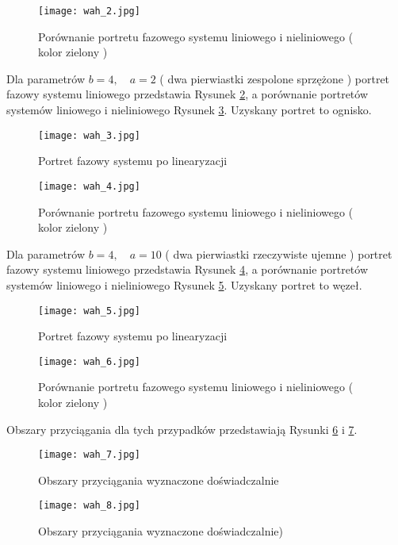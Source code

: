 \documentclass[a4paper,11pt]{article}
\begin{document}
\begin{figure}[H]
\centerline{\texttt{[image: wah\_2.jpg]}}
\caption{Porównanie portretu fazowego systemu liniowego i nieliniowego ( kolor zielony )}
\label{fig:wah_2}
\end{figure}
Dla parametrów \(b=4,\quad a=2\) ( dwa pierwiastki zespolone sprzężone ) portret fazowy systemu liniowego przedstawia Rysunek \ref{fig:wah_3}, a porównanie portretów systemów liniowego i nieliniowego Rysunek \ref{fig:wah_4}. Uzyskany portret to ognisko.
\begin{figure}[H]
\centerline{\texttt{[image: wah\_3.jpg]}}
\centering
\caption{Portret fazowy systemu po linearyzacji}
\label{fig:wah_3}
\end{figure}
\begin{figure}[H]
\centerline{\texttt{[image: wah\_4.jpg]}}
\caption{Porównanie portretu fazowego systemu liniowego i nieliniowego ( kolor zielony )}
\label{fig:wah_4}
\end{figure}
Dla parametrów \(b=4,\quad a=10\) ( dwa pierwiastki rzeczywiste ujemne ) portret fazowy systemu liniowego przedstawia Rysunek \ref{fig:wah_5}, a porównanie portretów systemów liniowego i nieliniowego Rysunek \ref{fig:wah_6}. Uzyskany portret to węzeł.
\begin{figure}[H]
\centerline{\texttt{[image: wah\_5.jpg]}}
\centering
\caption{Portret fazowy systemu po linearyzacji}
\label{fig:wah_5}
\end{figure}
\begin{figure}[H]
\centerline{\texttt{[image: wah\_6.jpg]}}
\caption{Porównanie portretu fazowego systemu liniowego i nieliniowego ( kolor zielony )}
\label{fig:wah_6}
\end{figure}
Obszary przyciągania dla tych przypadków przedstawiają Rysunki \ref{fig:wah_7} i \ref{fig:wah_8}.
\begin{figure}[H]
\centerline{\texttt{[image: wah\_7.jpg]}}
\centering
\caption{Obszary przyciągania wyznaczone doświadczalnie}
\label{fig:wah_7}
\end{figure}
\begin{figure}[H]
\centerline{\texttt{[image: wah\_8.jpg]}}
\caption{Obszary przyciągania wyznaczone doświadczalnie)}
\label{fig:wah_8}
\end{figure}
\end{document}
